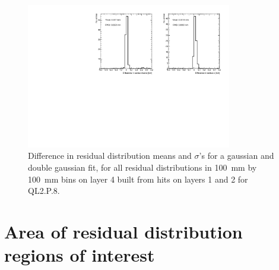\begin{figure}
    \centering
    \includegraphics[width = 0.8\textwidth]{figures/figure_compare_residual_fits_QL2P08_3100V_2021-06-18_no_dnl_minus_QL2P08_3100V_2021-07-19_doub_gaus_log_scale_layer4_fixedlayers12.pdf} 
    \caption{Difference in residual distribution means and $\sigma$'s for a gaussian and double gaussian fit, for all residual distributions in \SI{100}{\milli\meter} by \SI{100}{\milli\meter} bins on layer 4 built from hits on layers 1 and 2 for QL2.P.8.}
    \label{fig:double_gaussian_compare_fits}
\end{figure}

\section{Area of residual distribution regions of interest}
\label{appendix:systematics_bin_size}


